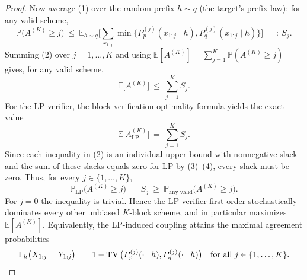 \begin{proof}
Now average (1) over the random prefix $h\sim q$ (the target's prefix law): for any valid scheme,
\begin{equation}
\mathbb P\big(A^{(K)}\ge j\big)
\ \le\ \mathbb E_{h\sim q}\Big[\sum_{x_{1:j}} \min\{P_p^{(j)}(x_{1:j}\mid h),P_q^{(j)}(x_{1:j}\mid h)\}\Big]
\ =:\ S_j.
\tag{2}
\end{equation}
Summing (2) over $j=1,\dots,K$ and using $\mathbb E[A^{(K)}]=\sum_{j=1}^K \mathbb P(A^{(K)}\ge j)$ gives, for any valid scheme,
\begin{equation}
\mathbb E\big[A^{(K)}\big] \ \le\ \sum_{j=1}^K S_j.
\tag{3}
\end{equation}
For the LP verifier, the block-verification optimality formula yields the exact value
\begin{equation}
\mathbb E\big[A^{(K)}_{\mathrm{LP}}\big] \ =\ \sum_{j=1}^K S_j.
\tag{4}
\end{equation}
Since each inequality in (2) is an individual upper bound with nonnegative slack and the sum of these slacks equals zero for LP by (3)--(4), every slack must be zero. Thus, for every $j\in\{1,\dots,K\}$,
\[
\mathbb P_{\mathrm{LP}}\big(A^{(K)}\ge j\big) \ =\ S_j \ \ge\ \mathbb P_{\text{any valid}}\big(A^{(K)}\ge j\big).
\]
For $j=0$ the inequality is trivial. Hence the LP verifier first-order stochastically dominates every other unbiased $K$-block scheme, and in particular maximizes $\mathbb E[A^{(K)}]$. Equivalently, the LP-induced coupling attains the maximal agreement probabilities
\[
\Gamma_h\big(X_{1:j}=Y_{1:j}\big)\ =\ 1-\operatorname{TV}\big(P_p^{(j)}(\cdot\mid h),P_q^{(j)}(\cdot\mid h)\big)\quad\text{for all }j\in\{1,\dots,K\}.\qedhere
\]
\end{proof}

